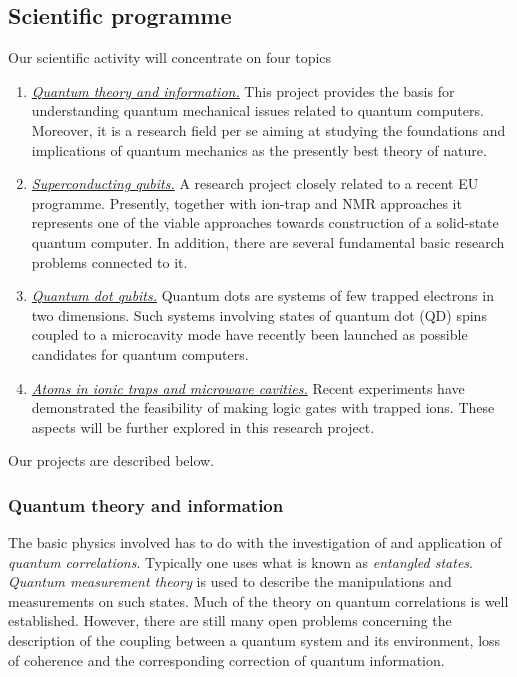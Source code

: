 \subsection{Scientific programme}

Our scientific activity will concentrate on four topics
\begin{enumerate}
\item \underline{\sl Quantum theory and information.\/} This project provides
      the basis for understanding quantum mechanical issues
      related to quantum computers. Moreover, it is a research field
      per se aiming at studying the foundations and implications
      of quantum mechanics as the presently best theory of nature.
\item \underline{\sl Superconducting qubits.\/} A research project closely
      related to a recent EU programme. Presently, together with ion-trap
      and NMR approaches it represents one of the viable approaches
      towards construction of a solid-state quantum computer. In addition,
      there are several fundamental basic research problems connected to it.
\item \underline{\sl Quantum dot qubits.\/} Quantum dots are systems of
      few trapped
      electrons in two dimensions. Such systems
      involving states of quantum dot (QD) spins
      coupled to a microcavity mode have recently been launched as
      possible candidates for quantum computers.
\item \underline{\sl Atoms in ionic traps and microwave cavities.\/}
      Recent experiments have demonstrated the feasibility of
      making logic gates with trapped ions. These aspects will
      be further explored in this research project.
\end{enumerate}

Our projects are described below.


\subsubsection{Quantum theory and information}

The basic physics involved has to do with the investigation of and
application of {\em quantum correlations}. Typically one uses what is
known as {\em entangled states}. {\em Quantum measurement theory} is used
to describe the manipulations and measurements on such states. Much
of the theory on quantum correlations is well established. However, there
are still many open problems concerning the description of the coupling
between a quantum system and its environment, loss of coherence and the
corresponding correction of quantum information.

